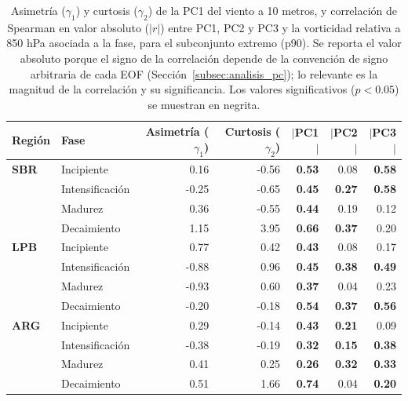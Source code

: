 \begin{table}[htbp]
\centering
\caption[Momentos estadísticos y correlación de PC1--PC3 del viento a 10 m - Subconjunto p90]
{Asimetría ($\gamma_1$) y curtosis ($\gamma_2$) de la PC1 del viento a 10 metros, y correlación de Spearman en valor absoluto ($|r|$) entre PC1, PC2 y PC3 y la vorticidad relativa a 850 hPa asociada a la fase, para el subconjunto extremo (p90). Se reporta el valor absoluto porque el signo de la correlación depende de la convención de signo arbitraria de cada EOF (Sección~\ref{subsec:analisis_pc}); lo relevante es la magnitud de la correlación y su significancia. Los valores significativos ($p<0.05$) se muestran en negrita.}
\label{tab:stat_p90_w10}
\begin{tabular*}{\textwidth}{@{\extracolsep{\fill}}llrrrrr}
\hline
\textbf{Región} & \textbf{Fase} & \textbf{Asimetría ($\gamma_1$)} & \textbf{Curtosis ($\gamma_2$)} & \textbf{$|$PC1$|$} & \textbf{$|$PC2$|$} & \textbf{$|$PC3$|$} \\
\hline
\textbf{SBR} & Incipiente       & 0.16  & -0.56 & \textbf{0.53} & 0.08 & \textbf{0.58} \\
             & Intensificación & -0.25 & -0.65 & \textbf{0.45} & \textbf{0.27} & \textbf{0.58} \\
             & Madurez         & 0.36  & -0.55 & \textbf{0.44} & 0.19 & 0.12 \\
             & Decaimiento     & 1.15  & 3.95  & \textbf{0.66} & \textbf{0.37} & 0.20 \\
\hline
\textbf{LPB} & Incipiente       & 0.77  & 0.42  & \textbf{0.43} & 0.08 & 0.17 \\
             & Intensificación & -0.88 & 0.96  & \textbf{0.45} & \textbf{0.38} & \textbf{0.49} \\
             & Madurez         & -0.93 & 0.60  & \textbf{0.37} & 0.04 & 0.23 \\
             & Decaimiento     & -0.20 & -0.18 & \textbf{0.54} & \textbf{0.37} & \textbf{0.56} \\
\hline
\textbf{ARG} & Incipiente       & 0.29  & -0.14 & \textbf{0.43} & \textbf{0.21} & 0.09 \\
             & Intensificación & -0.38 & -0.19 & \textbf{0.32} & \textbf{0.15} & \textbf{0.38} \\
             & Madurez         & 0.41  & 0.25  & \textbf{0.26} & \textbf{0.32} & \textbf{0.33} \\
             & Decaimiento     & 0.51  & 1.66  & \textbf{0.74} & 0.04 & \textbf{0.20} \\
\hline
\end{tabular*}
\end{table}
